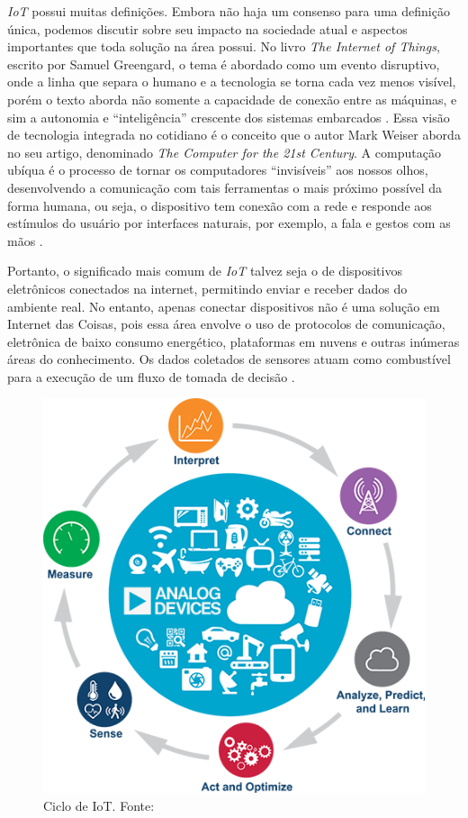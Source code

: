 \textit{IoT} possui muitas definições. Embora não haja um consenso para uma definição única, podemos discutir sobre seu impacto na sociedade atual e aspectos importantes que toda solução na área possui. No livro \textit{The Internet  of Things}, escrito por 
Samuel Greengard, o tema é abordado como um evento disruptivo, onde a linha que separa o humano e a tecnologia se torna cada vez menos visível, porém o texto aborda não somente a capacidade de conexão entre as máquinas, e sim a autonomia 
e ``inteligência'' crescente dos sistemas embarcados \cite[pp. 17]{book-iot}. Essa visão de tecnologia integrada no cotidiano é o conceito que o autor Mark Weiser aborda no seu artigo, denominado \textit{The Computer for the 21st Century}. A computação ubíqua 
é o processo de tornar os computadores ``invisíveis'' aos nossos olhos, desenvolvendo a comunicação com tais ferramentas o mais próximo possível da forma humana, ou seja, o dispositivo tem conexão com a rede e responde aos estímulos do usuário por 
interfaces naturais, por exemplo, a fala e gestos com as mãos \cite{ubiquitous-computing}.

Portanto, o significado mais comum de \textit{IoT} talvez seja o de dispositivos eletrônicos conectados na internet, permitindo 
enviar e receber dados do ambiente real. No entanto, apenas conectar dispositivos não é uma solução em Internet das Coisas, pois essa 
área envolve o uso de protocolos de comunicação, eletrônica de baixo consumo energético, plataformas em nuvens e outras inúmeras 
áreas do conhecimento. Os dados coletados de sensores atuam como combustível para a execução de um fluxo de tomada de decisão \cite{iot-cycle}. 

\begin{figure}[ht]
    \centering
    \includegraphics[width=.45\textwidth]{img/iot-cycle.png}
    \caption{Ciclo de IoT. Fonte: \cite{iot-cycle}}\label{figIoTCycle}
\end{figure}

